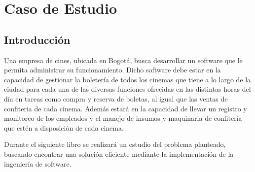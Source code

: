 \chapter{Caso de Estudio}
\section{Introducción}

Una empresa de cines, ubicada en Bogotá, busca desarrollar un software que le permita administrar su funcionamiento. Dicho software debe estar en la capacidad de gestionar la boletería de todos los cinemas que tiene a lo largo de la ciudad para cada una de las diversas funciones ofrecidas en las distintas horas del día en tareas como compra y reserva de boletas, al igual que las ventas de confiteria de cada cinema. Además estará en la capacidad de llevar un registro y monitoreo de los empleados y el manejo de insumos y maquinaria de confitería que estén a disposición de cada cinema.

Durante el siguiente libro se realizará un estudio del problema planteado, buscando encontrar una solución eficiente mediante la implementación de la ingeniería de software.